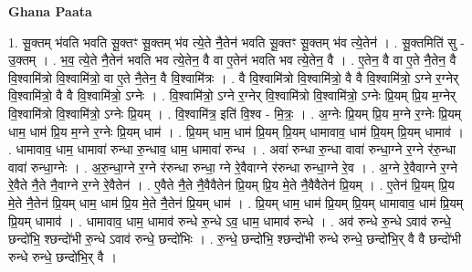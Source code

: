 \documentclass[17pt]{extarticle}
\begin{document}
\textbf{Ghana Paata } \newline

1. सू॒क्तम् भ॑वति भवति सू॒क्तꣳ सू॒क्तम् भ॑व त्ये॒ते नै॒तेन॑ भवति सू॒क्तꣳ सू॒क्तम् भ॑व त्ये॒तेन॑ । . सू॒क्तमिति॑ सु - उ॒क्तम् । . भ॒व॒ त्ये॒ते नै॒तेन॑ भवति भव त्ये॒तेन॒ वै वा ए॒तेन॑ भवति भव त्ये॒तेन॒ वै । . ए॒तेन॒ वै वा ए॒ते नै॒तेन॒ वै वि॒श्वामि॑त्रो वि॒श्वामि॑त्रो॒ वा ए॒ते नै॒तेन॒ वै वि॒श्वामि॑त्रः । . वै वि॒श्वामि॑त्रो वि॒श्वामि॑त्रो॒ वै वै वि॒श्वामि॑त्रो॒ ऽग्ने र॒ग्नेर् वि॒श्वामि॑त्रो॒ वै वै वि॒श्वामि॑त्रो॒ ऽग्नेः । . वि॒श्वामि॑त्रो॒ ऽग्ने र॒ग्नेर् वि॒श्वामि॑त्रो वि॒श्वामि॑त्रो॒ ऽग्नेः प्रि॒यम् प्रि॒य म॒ग्नेर् वि॒श्वामि॑त्रो वि॒श्वामि॑त्रो॒ ऽग्नेः प्रि॒यम् । . वि॒श्वामि॑त्र॒ इति॑ वि॒श्व - मि॒त्रः॒ । . अ॒ग्नेः प्रि॒यम् प्रि॒य म॒ग्ने र॒ग्नेः प्रि॒यम् धाम॒ धाम॑ प्रि॒य म॒ग्ने र॒ग्नेः प्रि॒यम् धाम॑ । . प्रि॒यम् धाम॒ धाम॑ प्रि॒यम् प्रि॒यम् धामावाव॒ धाम॑ प्रि॒यम् प्रि॒यम् धामाव॑ । . धामावाव॒ धाम॒ धामावा॑ रुन्धा रु॒न्धाव॒ धाम॒ धामावा॑ रुन्ध । . अवा॑ रुन्धा रु॒न्धा वावा॑ रुन्धा॒ग्ने र॒ग्ने र॑रु॒न्धा वावा॑ रुन्धा॒ग्नेः । . अ॒रु॒न्धा॒ग्ने र॒ग्ने र॑रुन्धा रुन्धा॒ ग्ने रे॒वैवाग्ने र॑रुन्धा रुन्धा॒ग्ने रे॒व । . अ॒ग्ने रे॒वैवाग्ने र॒ग्ने रे॒वैते नै॒ते नै॒वाग्ने र॒ग्ने रे॒वैतेन॑ । . ए॒वैते नै॒ते नै॒वैवैतेन॑ प्रि॒यम् प्रि॒य मे॒ते नै॒वैवैतेन॑ प्रि॒यम् । . ए॒तेन॑ प्रि॒यम् प्रि॒य मे॒ते नै॒तेन॑ प्रि॒यम् धाम॒ धाम॑ प्रि॒य मे॒ते नै॒तेन॑ प्रि॒यम् धाम॑ । . प्रि॒यम् धाम॒ धाम॑ प्रि॒यम् प्रि॒यम् धामावाव॒ धाम॑ प्रि॒यम् प्रि॒यम् धामाव॑ । . धामावाव॒ धाम॒ धामाव॑ रुन्धे रु॒न्धे ऽव॒ धाम॒ धामाव॑ रुन्धे । . अव॑ रुन्धे रु॒न्धे ऽवाव॑ रुन्धे॒ छन्दो॑भि॒ श्छन्दो॑भी रु॒न्धे ऽवाव॑ रुन्धे॒ छन्दो॑भिः । . रु॒न्धे॒ छन्दो॑भि॒ श्छन्दो॑भी रुन्धे रुन्धे॒ छन्दो॑भि॒र् वै वै छन्दो॑भी रुन्धे रुन्धे॒ छन्दो॑भि॒र् वै । \newline
\end{document}
